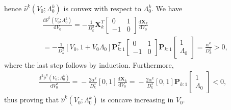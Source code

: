 \documentclass[10pt,twocolumn,twoside]{IEEEtran}
\theoremstyle{plain}
\begin{document}
hence $\hat\nu^k(V_0;\Lambda_0^{k})$ is convex with respect to $\Lambda_0^k$.
We have
\begin{align}
\label{derivV}
&\frac{\mathrm d\hat\nu^k(V_0;\Lambda_0^{k})}{\mathrm d V_0}
=
-\frac{1}{ D_k^2}
\mathbf X_{k}^T
\left[
\begin{array}{cc}
0 & 1
\\
-1&0
\end{array}\right]
\frac{\mathrm d\mathbf X_{k}}{\mathrm dV_0}
\\\nonumber
&=
-\frac{1}{ D_k^2}
[
V_0,1+V_0\Lambda_0
]
\mathbf P_{k:1}^T\!\!
\left[
\begin{array}{cc}
0 & 1
\\
-1&0
\end{array}\right]\!\!
\mathbf P_{k:1}\!\!
\left[
\begin{array}{c}
\!\!\!1\!\!\!\\\!\!\!\Lambda_0\!\!\!
\end{array}
\right]
\!=\!
\frac{\alpha^{k}}{ D_k^2}>0,
\end{align}
where the last step follows by induction. Furthermore,
\begin{align*}
\frac{\mathrm d^2\hat\nu^k(V_0;\Lambda_0^{k})}{\mathrm d V_0^2}
\!\!=\!\!-\frac{2\alpha^{k}}{ D_k^3}[0,1]\frac{\mathrm d\mathbf X_{k}}{\mathrm dV_0}
\!=\!
-\frac{2\alpha^{k}}{D_k^3}[0,1]
\mathbf P_{k:1}\!\!
\left[
\begin{array}{c}
\!\!\!1\!\!\!\\\!\!\!\Lambda_0\!\!\!
\end{array}
\right]\!\!<\!\!0,
\end{align*}
thus proving that $\hat\nu^k(V_0;\Lambda_0^{k})$ is concave increasing in $V_0$.
\hfill\QED
\end{document}
